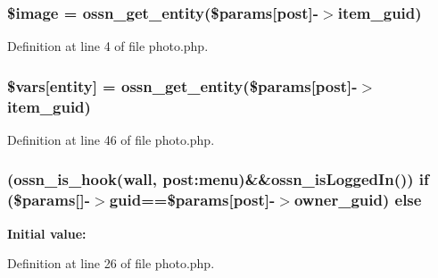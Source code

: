\subsubsection[{\texorpdfstring{\$image}{$image}}]{\setlength{\rightskip}{0pt plus 5cm}\$image = {\bf ossn\+\_\+get\+\_\+entity}(\$params\mbox{[}\textquotesingle{}post\textquotesingle{}\mbox{]}-\/$>$item\+\_\+guid)}\hypertarget{cover_2photo_8php_aac6146b4cdec66c94263ddb55afd5946}{}\label{cover_2photo_8php_aac6146b4cdec66c94263ddb55afd5946}


Definition at line 4 of file photo.\+php.

\subsubsection[{\texorpdfstring{\$vars}{$vars}}]{\setlength{\rightskip}{0pt plus 5cm}\$vars\mbox{[}\textquotesingle{}entity\textquotesingle{}\mbox{]} = {\bf ossn\+\_\+get\+\_\+entity}(\$params\mbox{[}\textquotesingle{}post\textquotesingle{}\mbox{]}-\/$>$item\+\_\+guid)}\hypertarget{cover_2photo_8php_aa07d093940e8b3330058e9f2c4396426}{}\label{cover_2photo_8php_aa07d093940e8b3330058e9f2c4396426}


Definition at line 46 of file photo.\+php.

\subsubsection[{\texorpdfstring{else}{else}}]{ ({\bf ossn\+\_\+is\+\_\+hook}(\textquotesingle{}wall\textquotesingle{}, \textquotesingle{}post\+:menu\textquotesingle{})\&\&ossn\+\_\+is\+Logged\+In()) {\bf if} (\$params\mbox{[}\textquotesingle{}\mbox{]}-\/$>$guid==\$params\mbox{[}\textquotesingle{}post\textquotesingle{}\mbox{]}-\/$>${\bf owner\+\_\+guid}) else}\hypertarget{cover_2photo_8php_a455b1f9c77db61838a93b44445ad7413}{}\label{cover_2photo_8php_a455b1f9c77db61838a93b44445ad7413}
{\bfseries Initial value\+:}


Definition at line 26 of file photo.\+php.

